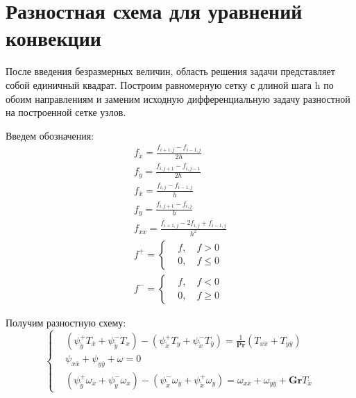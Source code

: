 \documentclass[a4paper, 12pt]{article}
\newcommand{\Pra}{\mathbf{Pr}}
\newcommand{\Gra}{\mathbf{Gr}}
\newcommand{\psp}[2]{\psi_{\mathring{#1}}^{#2}}
\begin{document}
  \section{Разностная схема для уравнений конвекции}
    После введения безразмерных величин, область решения задачи представляет
    собой единичный квадрат. Построим равномерную сетку с длиной шага h по обоим
    направлениям и заменим исходную дифференциальную задачу разностной на
    построенной сетке узлов.

    Введем обозначения:
    \begin{gather*}
      f_{\mathring{x}} = \frac{f_{i+1,j} - f_{i-1,j}}{2 h}
      \\
      f_{\mathring{y}} = \frac{f_{i,j+1} - f_{i,j-1}}{2 h}
      \\
      f_{\overline{x}} = \frac{f_{i,j} - f_{i-1,j}}{h}
      \\
      f_{y} = \frac{f_{i,j+1} - f_{i,j}}{h}
      \\
      f_{x \overline{x}} = \frac{f_{i+1,j} - 2 f_{i,j} + f_{i-1,j}}{h^2}
      \\
      f^{+} = \left\{
        \begin{aligned}
          &f, \quad f > 0\\
          &0, \quad f \leq 0
        \end{aligned}
      \right.
      \\
      f^{-} = \left\{
        \begin{aligned}
          &f, \quad f < 0\\
          &0, \quad f \geq 0
        \end{aligned}
      \right.
    \end{gather*}

    Получим разностную схему:
    \begin{equation}
      \left\{
        \begin{aligned}
          &\left( \psp{y}{+} T_{\overline{x}} + \psp{y}{-} T_{x} \right) -
            \left( \psp{x}{+} T_{y} + \psp{x}{-} T_{\overline{y}} \right) =
            \frac{1}{\Pra}\left( T_{x \overline{x}} + T_{y \overline{y}} \right)
          \\
          &\psi_{x \overline{x}} + \psi_{y \overline{y}} + \omega = 0
          \\
          &\left(
            \psp{y}{+} \omega_{\overline{x}} + \psp{y}{-} \omega_{x}
          \right) - \left(
            \psp{x}{-} \omega_{\overline{y}} + \psp{x}{+} \omega_{y}
          \right) =
            \omega_{x \overline{x}} + \omega_{y \overline{y}} +
            \Gra T_{\mathring{x}}
        \end{aligned}
      \right.\label{diff_scheme}
    \end{equation}
\end{document}
